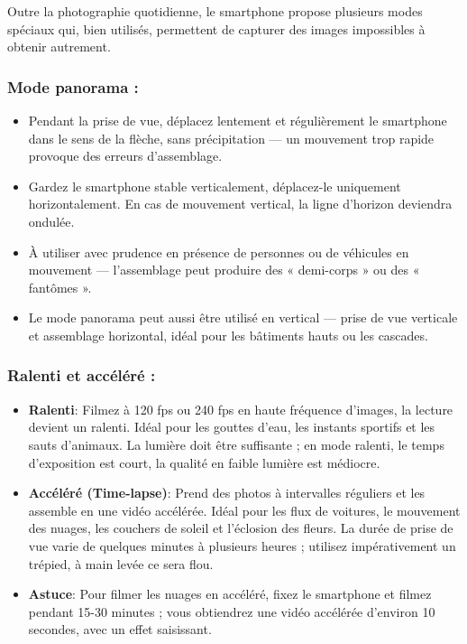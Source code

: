 Outre la photographie quotidienne, le smartphone propose plusieurs modes spéciaux qui, bien utilisés, permettent de capturer des images impossibles à obtenir autrement.

\subsubsection*{Mode panorama :}

\begin{itemize}
  \item Pendant la prise de vue, déplacez lentement et régulièrement le smartphone dans le sens de la flèche, sans précipitation — un mouvement trop rapide provoque des erreurs d'assemblage.
  \item Gardez le smartphone stable verticalement, déplacez-le uniquement horizontalement. En cas de mouvement vertical, la ligne d'horizon deviendra ondulée.
  \item À utiliser avec prudence en présence de personnes ou de véhicules en mouvement — l'assemblage peut produire des « demi-corps » ou des « fantômes ».
  \item Le mode panorama peut aussi être utilisé en vertical — prise de vue verticale et assemblage horizontal, idéal pour les bâtiments hauts ou les cascades.
\end{itemize}

\subsubsection*{Ralenti et accéléré :}

\begin{itemize}
  \item \textbf{Ralenti}: Filmez à 120 fps ou 240 fps en haute fréquence d'images, la lecture devient un ralenti. Idéal pour les gouttes d'eau, les instants sportifs et les sauts d'animaux. La lumière doit être suffisante ; en mode ralenti, le temps d'exposition est court, la qualité en faible lumière est médiocre.
  \item \textbf{Accéléré (Time-lapse)}: Prend des photos à intervalles réguliers et les assemble en une vidéo accélérée. Idéal pour les flux de voitures, le mouvement des nuages, les couchers de soleil et l'éclosion des fleurs. La durée de prise de vue varie de quelques minutes à plusieurs heures ; utilisez impérativement un trépied, à main levée ce sera flou.
  \item \textbf{Astuce}: Pour filmer les nuages en accéléré, fixez le smartphone et filmez pendant 15-30 minutes ; vous obtiendrez une vidéo accélérée d'environ 10 secondes, avec un effet saisissant.
\end{itemize}

